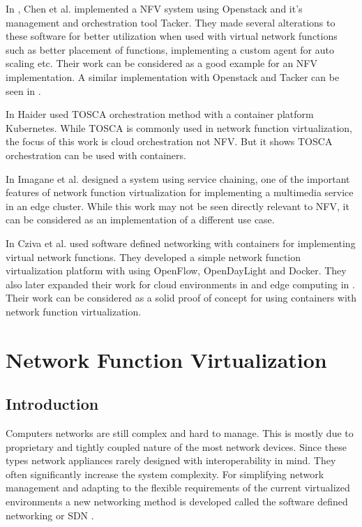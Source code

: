 \documentclass[12pt,oneandhalf,chaparabic,ceng,ms,eng,oneside,pntc]{gsufbe}
\begin{document}
In \cite{chen_implementing_2017}, Chen et al.  implemented a NFV system using Openstack and it's
management and orchestration tool Tacker.  They made several alterations to these software for better
utilization when used with virtual network functions such as better placement of functions, implementing
a custom agent for auto scaling etc.  Their work can be considered as a good example for an NFV
implementation.  A similar implementation with Openstack and Tacker can be seen in \cite{tahir_master}.

In \cite{haider_md_rezzakul_deployment_2017} Haider used TOSCA orchestration method with a container
platform Kubernetes.  While TOSCA is commonly used in network function virtualization, the focus of this
work is cloud orchestration not NFV.  But it shows TOSCA orchestration can be used with containers.

In \cite{imagane_performance_2018} Imagane et al.  designed a system using service chaining, one of the
important features of network function virtualization for implementing a multimedia service in an edge
cluster.  While this work may not be seen directly relevant to NFV, it can be considered as an
implementation of a different use case.

In \cite{cziva_container-based_2015} Cziva et al.  used software defined networking with containers for
implementing virtual network functions.  They developed a simple network function virtualization platform
with using OpenFlow, OpenDayLight and Docker.  They also later expanded their work for cloud environments
in \cite{cziva_gnfc_2015} and edge computing in \cite{cziva_container_2017}.  Their work can be 
considered as a solid proof of concept for using containers with network function virtualization.

\chapter{Network Function Virtualization}
\section{Introduction}
Computers networks are still complex and hard to manage.  This is mostly due to proprietary and tightly
coupled nature of the most network devices.  Since these types network appliances rarely designed with
interoperability in mind.  They often significantly increase the system complexity.  For simplifying
network management and adapting to the flexible requirements of the current virtualized environments a
new networking method is developed called the software defined networking or SDN
\cite{chayapathi_network_2016}.
\end{document}
